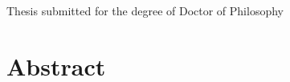 



{}


\begin{center}
{\LARGE\bfseries \thetitle\\}
{\Large\bfseries \theauthor\\}
{\large Thesis submitted for the degree of Doctor of Philosophy\\
\thedate}
\end{center}

\section*{Abstract}


